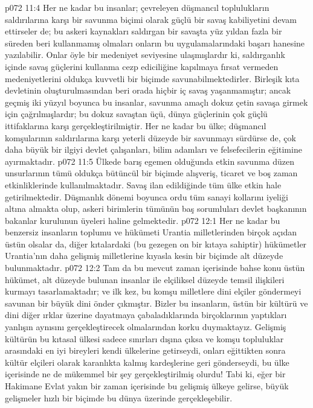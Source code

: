 \vs p072 11:4 Her ne kadar bu insanlar; çevreleyen düşmancıl toplulukların saldırılarına karşı bir savunma biçimi olarak güçlü bir savaş kabiliyetini devam ettirseler de; bu askeri kaynakları saldırgan bir savaşta yüz yıldan fazla bir süreden beri kullanmamış olmaları onların bu uygulamalarındaki başarı hanesine yazılabilir. Onlar öyle bir medeniyet seviyesine ulaşmışlardır ki, saldırganlık içinde savaş güçlerini kullanma cezp ediciliğine kapılmaya fırsat vermeden medeniyetlerini oldukça kuvvetli bir biçimde savunabilmektedirler. Birleşik kıta devletinin oluşturulmasından beri orada hiçbir iç savaş yaşanmamıştır; ancak geçmiş iki yüzyıl boyunca bu insanlar, savunma amaçlı dokuz çetin savaşa girmek için çağrılmışlardır; bu dokuz savaştan üçü, dünya güçlerinin çok güçlü ittifaklarına karşı gerçekleştirilmiştir. Her ne kadar bu ülke; düşmancıl komşularının saldırılarına karşı yeterli düzeyde bir savunmayı sürdürse de, çok daha büyük bir ilgiyi devlet çalışanları, bilim adamları ve felsefecilerin eğitimine ayırmaktadır.
\vs p072 11:5 Ülkede barış egemen olduğunda etkin savunma düzen unsurlarının tümü oldukça bütüncül bir biçimde alışveriş, ticaret ve boş zaman etkinliklerinde kullanılmaktadır. Savaş ilan edildiğinde tüm ülke etkin hale getirilmektedir. Düşmanlık dönemi boyunca ordu tüm sanayi kollarını iyeliği altına almakta olup, askeri birimlerin tümünün baş sorumluları devlet başkanının bakanlar kurulunun üyeleri haline gelmektedir.
\vs p072 12:1 Her ne kadar bu benzersiz insanların toplumu ve hükümeti Urantia milletlerinden birçok açıdan üstün olsalar da, diğer kıtalardaki (bu gezegen on bir kıtaya sahiptir) hükümetler Urantia’nın daha gelişmiş milletlerine kıyasla kesin bir biçimde alt düzeyde bulunmaktadır.
\vs p072 12:2 Tam da bu mevcut zaman içerisinde bahse konu üstün hükümet, alt düzeyde bulunan insanlar ile elçiliksel düzeyde temsil ilişkileri kurmayı tasarlamaktadır; ve ilk kez, bu komşu milletlere dini elçiler göndermeyi savunan bir büyük dini önder çıkmıştır. Bizler bu insanların, üstün bir kültürü ve dini diğer ırklar üzerine dayatmaya çabaladıklarında birçoklarının yaptıkları yanlışın aynısını gerçekleştirecek olmalarından korku duymaktayız. Gelişmiş kültürün bu kıtasal ülkesi sadece sınırları dışına çıksa ve komşu topluluklar arasındaki en iyi bireyleri kendi ülkelerine getirseydi, onları eğittikten sonra kültür elçileri olarak karanlıkta kalmış kardeşlerine geri gönderseydi, bu ülke içerisinde ne de mükemmel bir şey gerçekleştirilmiş olurdu! Tabi ki, eğer bir Hakimane Evlat yakın bir zaman içerisinde bu gelişmiş ülkeye gelirse, büyük gelişmeler hızlı bir biçimde bu dünya üzerinde gerçekleşebilir.

